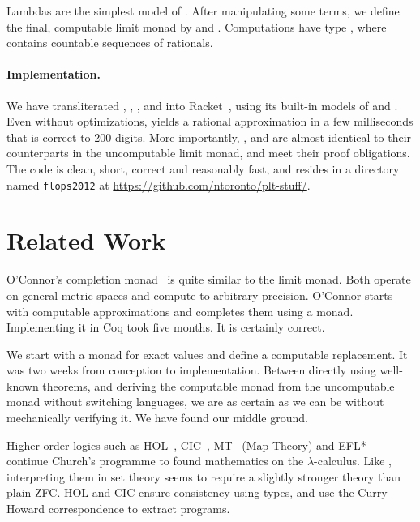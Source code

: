 Lambdas are the simplest model of \tlzfc{\lnat \to \metricuniv}. After manipulating some terms, we define the final, computable limit monad by  and . Computations have type , where  contains countable sequences of rationals.

\paragraph{Implementation.}
We have transliterated , , ,  and  into Racket~\cite{cit:racket-lang}, using its built-in models of \tlzfc{\lnat} and \tlzfc{\Rat}. Even without optimizations,  yields a rational approximation in a few milliseconds that is correct to 200 digits. More importantly, ,  and  are almost identical to their counterparts in the uncomputable limit monad, and meet their proof obligations. The code is clean, short, correct and reasonably fast, and resides in a directory named \texttt{flops2012} at \url{https://github.com/ntoronto/plt-stuff/}.


\section{Related Work}

O'Connor's completion monad~\cite{cit:oconnor-2008-real-numbers} is quite similar to the limit monad. Both operate on general metric spaces and compute to arbitrary precision. O'Connor starts with computable approximations and completes them using a monad. Implementing it in Coq took five months. It is certainly correct.

We start with a monad for exact values and define a computable replacement. It was two weeks from conception to implementation. Between directly using well-known theorems, and deriving the computable monad from the uncomputable monad without switching languages, we are as certain as we can be without mechanically verifying it. We have found our middle ground.

Higher-order logics such as HOL~\cite{leivant-1994-hol}, CIC~\cite{cit:book-coqart}, MT~\cite{cit:berline-1997-mt} (Map Theory) and EFL*~\cite{cit:myhill-1989-efl} continue Church's programme to found mathematics on the $\lambda$-calculus. Like \targetlang, interpreting them in set theory seems to require a slightly stronger theory than plain ZFC. HOL and CIC ensure consistency using types, and use the Curry-Howard correspondence to extract programs.

